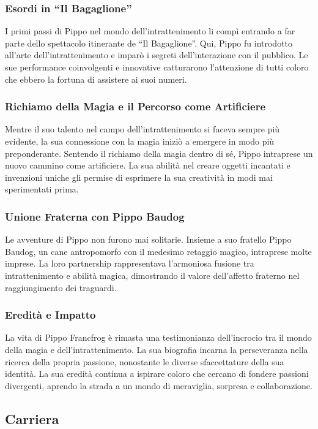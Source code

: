 \subsubsection{Esordi in ``Il Bagaglione''}
I primi passi di Pippo nel mondo dell'intrattenimento li compì entrando
a far parte dello spettacolo itinerante de ``Il Bagaglione''. Qui, Pippo
fu introdotto all'arte dell'intrattenimento e imparò i segreti
dell'interazione con il pubblico. Le sue performance coinvolgenti e
innovative catturarono l'attenzione di tutti coloro che ebbero la
fortuna di assistere ai suoi numeri.

\subsubsection{Richiamo della Magia e il Percorso come Artificiere}
Mentre il suo talento nel campo dell'intrattenimento si faceva sempre
più evidente, la sua connessione con la magia iniziò a emergere in modo
più preponderante. Sentendo il richiamo della magia dentro di sé, Pippo
intraprese un nuovo cammino come artificiere. La sua abilità nel creare
oggetti incantati e invenzioni uniche gli permise di esprimere la sua
creatività in modi mai sperimentati prima.

\subsubsection{Unione Fraterna con Pippo Baudog}
Le avventure di Pippo non furono mai solitarie. Insieme a suo fratello
Pippo Baudog, un cane antropomorfo con il medesimo retaggio magico,
intraprese molte imprese. La loro partnership rappresentava l'armoniosa
fusione tra intrattenimento e abilità magica, dimostrando il valore
dell'affetto fraterno nel raggiungimento dei traguardi.

\subsubsection{Eredità e Impatto}
La vita di Pippo Francfrog è rimasta una testimonianza dell'incrocio tra
il mondo della magia e dell'intrattenimento. La sua biografia incarna la
perseveranza nella ricerca della propria passione, nonostante le diverse
sfaccettature della sua identità. La sua eredità continua a ispirare
coloro che cercano di fondere passioni divergenti, aprendo la strada a
un mondo di meraviglia, sorpresa e collaborazione.

\subsection{Carriera}\label{carriera}


